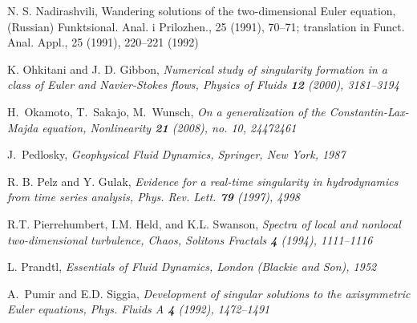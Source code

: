 \documentclass[reqno,centertags, 11pt]{amsart}
\begin{document}
\begin{thebibliography}{99}
 N. S. Nadirashvili, Wandering solutions of the two-dimensional Euler equation, (Russian)
Funktsional. Anal. i Prilozhen., 25 (1991), 70--71; translation in Funct. Anal. Appl., 25 (1991),
220--221 (1992)





 K. Ohkitani and J. D. Gibbon, \it  Numerical study of singularity formation in a class of Euler and Navier-Stokes flows,
\rm Physics of Fluids {\bf 12} (2000), 3181--3194

 H.~Okamoto, T.~Sakajo, M.~Wunsch, \it On a generalization of the Constantin-Lax-Majda
equation, \rm Nonlinearity {\bf 21} (2008), no. 10, 24472461


 J.~Pedlosky, \it Geophysical Fluid Dynamics, \rm
Springer, New York, 1987

 R. B. Pelz and Y. Gulak, \it Evidence for a real-time singularity in hydrodynamics
from time series analysis, \rm  Phys. Rev. Lett. {\bf 79} (1997), 4998

R.T. Pierrehumbert, I.M. Held, and K.L. Swanson,
\it  Spectra of local and nonlocal two-dimensional turbulence,
\rm  Chaos, Solitons Fractals {\bf 4} (1994), 1111--1116

 L. Prandtl, \it Essentials of Fluid Dynamics, \rm
London (Blackie and Son), 1952


 A.~Pumir and E.D. Siggia, \it Development of singular solutions to the axisymmetric
Euler equations, \rm Phys. Fluids A {\bf 4} (1992), 1472--1491


\end{thebibliography}
\end{document}
